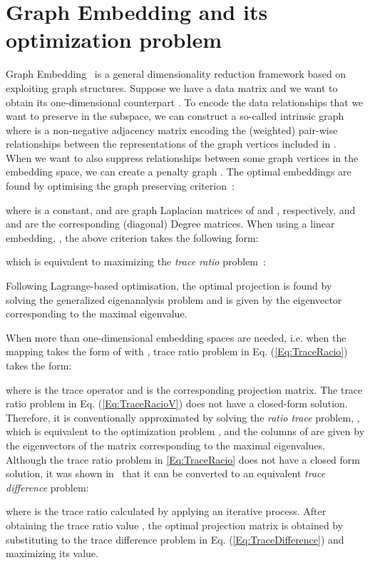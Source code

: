 \documentclass[journal]{IEEEtran}
\begin{document}
 


\section{Graph Embedding and its optimization problem}\label{SS:GraphEmbedding}


Graph Embedding~\cite{yan2006mfa} is a general dimensionality reduction framework based on exploiting graph structures. Suppose we have a data matrix  and we want to obtain its one-dimensional counterpart . To encode the data relationships that we want to preserve in the subspace, we can construct a so-called intrinsic graph  where  is a non-negative adjacency matrix encoding the (weighted) pair-wise relationships between the representations of the graph vertices included in . When we want to also suppress relationships between some graph vertices in the embedding space, we can create a penalty graph . The optimal embeddings  are found by optimising the graph preserving criterion~\cite{yan2006mfa}:

where  is a constant,  and  are  graph Laplacian matrices of  and , respectively, and  and  are the corresponding (diagonal) Degree matrices. When using a linear embedding, , the above criterion takes the following form:

which is equivalent to maximizing the \emph{trace ratio} problem~\cite{jia2009trace, iosfidis2013}:

Following Lagrange-based optimisation, the optimal projection  is found by solving the generalized eigenanalysis problem  and is given by the eigenvector corresponding to the maximal eigenvalue. 

When more than one-dimensional embedding spaces are needed, i.e. when the mapping takes the form of  with , trace ratio problem in Eq. (\ref{Eq:TraceRacio}) takes the form:

where  is the trace operator and  is the corresponding projection matrix. The trace ratio problem in Eq. (\ref{Eq:TraceRacioV}) does not have a closed-form solution. Therefore, it is conventionally approximated by solving the \emph{ratio trace} problem, , which is equivalent to the optimization problem , and the columns of  are given by the eigenvectors of the matrix  corresponding to the  maximal eigenvalues. Although the trace ratio problem in \cref{Eq:TraceRacio} does not have a closed form solution, it was shown in~\cite{jia2009trace} that it can be converted to an equivalent \emph{trace difference} problem:

where  is the trace ratio calculated by applying an iterative process. After obtaining the trace ratio value , the optimal projection matrix  is obtained by substituting  to the trace difference problem in Eq. (\ref{Eq:TraceDifference}) and maximizing its value.
\end{document}

